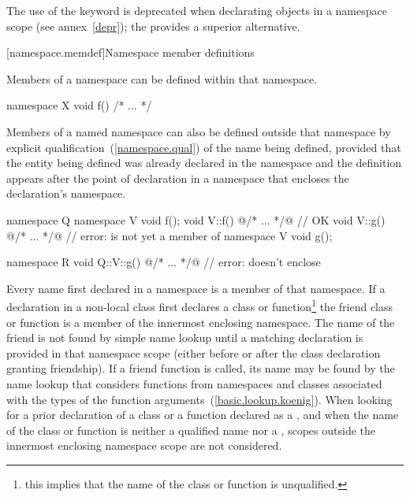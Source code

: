 \pnum
The use of the  keyword is deprecated when declarating
objects in a namespace scope (see annex~\ref{depr}); the
 provides a superior alternative.

[namespace.memdef]{Namespace member definitions}%

\pnum
Members of a namespace can be defined within that namespace.
\enterexample

\begin{codeblock}
namespace X {
	void f() { /* ... */ }
}
\end{codeblock}
\exitexampleb

\pnum
Members of a named namespace can also be
defined outside that namespace by explicit
qualification~(\ref{namespace.qual}) of the name being defined, provided
that the entity being defined was already declared in the namespace and
the definition appears after the point of declaration in a namespace
that encloses the declaration's namespace.
\enterexample

\begin{codeblock}
namespace Q {
	namespace V {
		void f();
	}
	void V::f() { @/* ... */@ }	// OK
	void V::g() { @/* ... */@ }	// error:  is not yet a member of 
	namespace V {
		void g();
	}
}

namespace R {
	void Q::V::g() { @/* ... */@ }	// error:  doesn't enclose 
}
\end{codeblock}
\exitexampleb

\pnum
Every name first declared in a namespace is a member of that namespace.
If a  declaration in a non-local class first declares a
class or function\footnote{this implies that the name of the class or function is unqualified.}
the friend class or function is a member of the innermost enclosing
namespace. The name of the friend is not found by simple name lookup
until a matching declaration is provided in that namespace scope (either
before or after the class declaration granting friendship). If a friend
function is called, its name may be found by the name lookup that
considers functions from namespaces and classes associated with the
types of the function arguments~(\ref{basic.lookup.koenig}). When looking
for a prior declaration of a class or a function declared as a
, and when the name of the  class or function
is neither a qualified name nor a , scopes
outside the innermost enclosing namespace scope are not considered.
\enterexample

